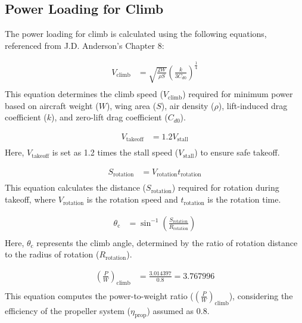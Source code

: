 \documentclass[12 pt]{article}
\begin{document}
\subsection{{Power Loading for Climb}}

The power loading for climb is calculated using the following equations, referenced from J.D. Anderson's Chapter 8:

\begin{align*}
V_{\text{climb}} &= \sqrt{\frac{2W}{\rho S}} \left(\frac{k}{3C_{d0}}\right)^{\frac{1}{4}} \tag{3.12} \\
\end{align*}
This equation determines the climb speed ($V_{\text{climb}}$) required for minimum power based on aircraft weight ($W$), wing area ($S$), air density ($\rho$), lift-induced drag coefficient ($k$), and zero-lift drag coefficient ($C_{d0}$).

\begin{align*}
V_{\text{takeoff}} &= 1.2 V_{\text{stall}} \tag{3.13} \\
\end{align*}
Here, $V_{\text{takeoff}}$ is set as 1.2 times the stall speed ($V_{\text{stall}}$) to ensure safe takeoff.

\begin{align*}
S_{\text{rotation}} &= V_{\text{rotation}} t_{\text{rotation}} \tag{3.14} \\
\end{align*}
This equation calculates the distance ($S_{\text{rotation}}$) required for rotation during takeoff, where $V_{\text{rotation}}$ is the rotation speed and $t_{\text{rotation}}$ is the rotation time.

\begin{align*}
\theta_{\text{c}} &= \sin^{-1}\left(\frac{S_{\text{rotation}}}{R_{\text{rotation}}}\right) \tag{3.15} \\
\end{align*}
Here, $\theta_{\text{c}}$ represents the climb angle, determined by the ratio of rotation distance to the radius of rotation ($R_{\text{rotation}}$).

\begin{align*}
\left(\frac{P}{W}\right)_{\text{climb}} &= \frac{3.014397}{0.8} = 3.767996 \tag{3.16} \\
\end{align*}
This equation computes the power-to-weight ratio ($\left(\frac{P}{W}\right)_{\text{climb}}$), considering the efficiency of the propeller system ($\eta_{\text{prop}}$) assumed as 0.8.
\end{document}
